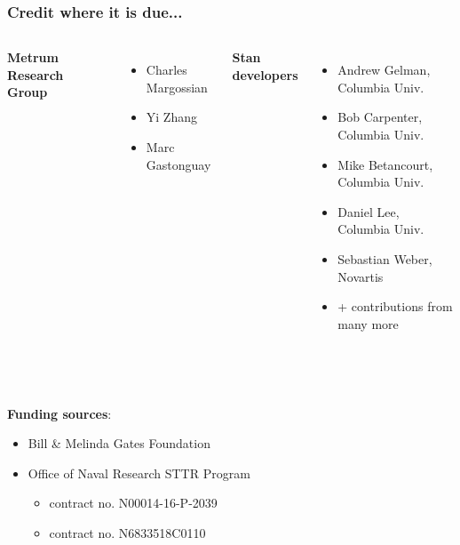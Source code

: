 \documentclass{beamer}
\begin{document}
\begin{frame}
  \frametitle{Credit where it is due...}
  
  \begin{columns}[t]
{\bf Metrum Research Group}
\begin{itemize}
  \item Charles Margossian
\item Yi Zhang
\item Marc Gastonguay
\end{itemize}
{\bf Stan developers}
\begin{itemize}
\item Andrew Gelman, Columbia Univ.
\item Bob Carpenter, Columbia Univ.
\item Mike Betancourt, Columbia Univ.
\item Daniel Lee, Columbia Univ.
\item Sebastian Weber, Novartis
\item + contributions from many more
\end{itemize}
  \end{columns}
\ \\ \ \\
{\bf Funding sources}:
\begin{itemize}
\item Bill \& Melinda Gates Foundation
\item Office of Naval Research STTR Program
  \begin{itemize}
  \item contract no. N00014-16-P-2039
\item contract no. N6833518C0110
  \end{itemize}
\end{itemize}

\end{frame}

\end{document}
